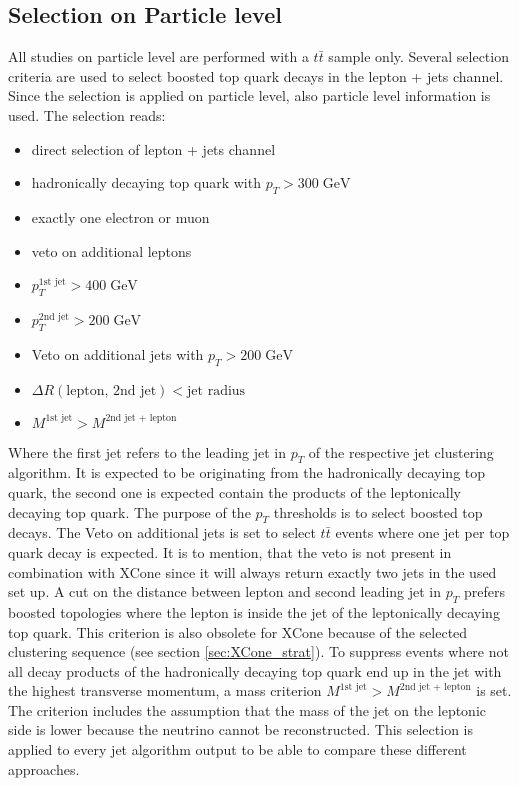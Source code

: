 \subsection{Selection on Particle level}
\label{sec:GenSel}
	All studies on particle level are performed with a $t\bar{t}$ sample only. Several selection criteria are used to select boosted top quark decays in the lepton + jets channel. Since the selection is applied on particle level, also particle level information is used. The selection reads:
	\begin{itemize}
	\item direct selection of lepton + jets channel
	\item hadronically decaying top quark with $p_T > 300\;\text{GeV}$
	\item exactly one electron or muon
	\item veto on additional leptons
	\item $p_T^{\text{1st jet}} > 400\;\text{GeV}$ 
	\item $p_T^{\text{2nd jet}} > 200\;\text{GeV}$ 
	\item Veto on additional jets with $p_T > 200\;\text{GeV}$ 
	\item $\Delta R (\text{lepton, 2nd jet}) < \text{jet radius}$
	\item $M^{\text{1st jet}} > M^{\text{2nd jet + lepton}}$
	\end{itemize}
	Where the first jet refers to the leading jet in $p_T$ of the respective jet clustering algorithm. It is expected to be originating from the hadronically decaying top quark, the second one is expected contain the products of the leptonically decaying top quark. The purpose of the $p_T$ thresholds is to select boosted top decays. The Veto on additional jets is set to select $t\bar{t}$ events where one jet per top quark decay is expected. It is to mention, that the veto is not present in combination with XCone since it will always return exactly two jets in the used set up. A cut on the distance between lepton and second leading jet in $p_T$ prefers boosted topologies where the lepton is inside the jet of the leptonically decaying top quark. This criterion is also obsolete for XCone because of the selected clustering sequence (see section \ref{sec:XCone_strat}). To suppress events where not all decay products of the hadronically decaying top quark end up in the jet with the highest transverse momentum, a mass criterion $M^{\text{1st jet}} > M^{\text{2nd jet + lepton}}$ is set. The criterion includes the assumption that the mass of the jet on the leptonic side is lower because the neutrino cannot be reconstructed. This selection is applied to every jet algorithm output to be able to compare these different approaches.

